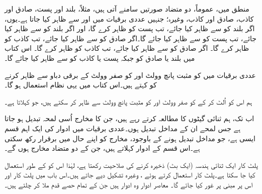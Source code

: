 منطق میں، عموماً،  دو متضاد صورتیں سامنے آتی ہیں، مثلاً،  بلند اور پست،  صادق  اور کاذب، صادق اور کاذب، وغیرہ؛ جنہیں  عددی  برقیات  میں   اور  سے ظاہر کیا جاتا ہے۔یوں،  اگر بلند   کو  سے ظاہر کیا جائے،  تب  پست کو  ظاہر کرے گا،  اور اگر بلند کو   سے  ظاہر   کیا جائے، تب  پست  کو   سے ظاہر  کیا جائے  گا۔اگر  صادق کو  سے ظاہر کیا جائے،  تب کاذب  کو    ظاہر کرے گا۔ اگر صادق کو  سے ظاہر کیا جائے،  تب کاذب کو   ظاہر کرے گا۔  اس کتاب میں بلند یا صادق کو  جبکہ پست یا کاذب کو  سے ظاہر کیا جائے گا۔

عددی برقیات میں   کو مثبت پانچ وولٹ     اور   کو   صفر وولٹ   کے برقی دباو سے ظاہر  کرنے کو   کہتے ہیں۔اس کتاب میں یہی نظام استعمال  ہو گا۔

ہم اس  کو اُلٹ کر کے  کو صفر  وولٹ    اور  کو مثبت پانچ وولٹ     سے  ظاہر کر سکتے ہیں، جو   کہلاتا ہے۔


اب تک،  ہم   ثنائی گیٹوں کا مطالعہ کرتے رہے ہیں،  جن کا مخارج اُسی لمحہ تبدیل ہو  جاتا  ہے جس لمحے  ان کے  مداخل تبدیل ہوں۔عددی برقیات میں  ادوار کی ایک  اہم  قسم ایسی ہے،   جو  مداخل   تبدیل ہونے کے باوجود،     مخارج کو اپنے حال میں  برقرار رکھ سکتی  ہے۔اس قسم کے ادوار   کہلاتے  ہیں، جن    کے دو متضاد مخارج ہوں گے۔

پلٹ کار ایک ثنائی ہندسہ (ایک بٹ)  ذخیرہ کرنے کی صلاحیت رکھتا ہے، لہٰذا  اس کو      کے طور استعمال کیا جا سکتا ہے۔پلٹ کار   استعمال کرتے ہوئے ،  وغیرہ  تشکیل دیے جاتے ہیں۔اس باب میں پلٹ کار اور اس پر مبنی   پر غور کیا جائے گا۔ معاصر ادوار  وہ  ادوار ہیں جن کے تمام حصے قدم ملا کر چلتے ہیں۔


